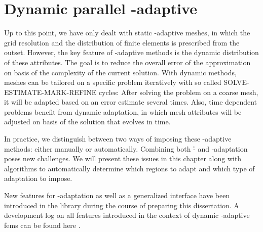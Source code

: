 \chapter{Dynamic parallel \hp-adaptive }
\label{ch:dynamic}
\glsresetall

Up to this point, we have only dealt with static \hp-adaptive meshes, in which the grid resolution and the distribution of finite elements is prescribed from the outset.%
However, the key feature of \hp-adaptive methods is the dynamic distribution of these attributes. The goal is to reduce the overall error of the approximation on basis of the complexity of the current solution. With dynamic methods, meshes can be tailored on a specific problem iteratively with so called SOLVE-ESTIMATE-MARK-REFINE cycles: After solving the problem on a coarse mesh, it will be adapted based on an error estimate several times. Also, time dependent problems benefit from dynamic adaptation, in which mesh attributes will be adjusted on basis of the solution that evolves in time.

In practice, we distinguish between two ways of imposing these \hp-adaptive methods: either manually or automatically. Combining both \h- and \p-adaptation poses new challenges. We will present these issues in this chapter along with algorithms to automatically determine which regions to adapt and which type of adaptation to impose.

New features for \hp-adaptation as well as a generalized interface have been introduced in the \dealii{} library \textcite{dealii920pre} during the course of preparing this dissertation. A development log on all features introduced in the context of dynamic \hp-adaptive \glspl{fem} can be found here \cite{dealiiissue7515}.




